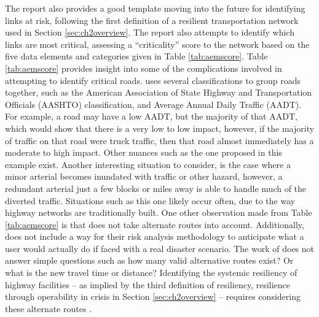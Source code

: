 The report also provides a good template moving into the future for identifying
links at risk,
following the first definition of a resilient transportation network used in Section \ref{sec:ch2overview}. The
report also attempts to
identify which links are most critical, assessing a “criticality”
score to the network
based on the five data elements and categories given in Table \ref{tab:aemscore}.
Table \ref{tab:aemscore} provides insight into some of the complications involved in
attempting to identify critical roads. \citeauthor{aem2017} uses several classifications to group
roads together, such as the American Association of State Highway and Transportation
Officials (AASHTO) classification, and Average Annual Daily Traffic (AADT). For example, a road may have a low AADT, but
the majority of that AADT, which would show that there is a very low to low impact,
however, if the majority of traffic on that road were truck traffic, then that road almost
immediately has a moderate to high impact. Other nuances such as the one proposed in this
example exist. Another interesting situation to consider, is the case where a minor arterial becomes inundated with traffic or other hazard, however, a redundant arterial just a few blocks or miles away is able to handle much of the diverted traffic. Situations such as this one likely occur often, due to the way highway networks are traditionally built. One other observation made from Table
\ref{tab:aemscore} is that \citeauthor{aem2017} does not take alternate routes into account.
Additionally, \citeauthor{aem2017} does not include a way for their risk analysis methodology
to anticipate what a user would actually do if faced with a real disaster
scenario. The work of \citeauthor{aem2017} does not answer simple questions such as how many valid
alternative routes exist? Or what is the new travel time or distance?
Identifying the systemic resiliency of highway facilities
– as implied by the third definition of resiliency, resilience through
operability in crisis in Section \ref{sec:ch2overview} – requires considering these alternate routes \citep{aem2017}.

